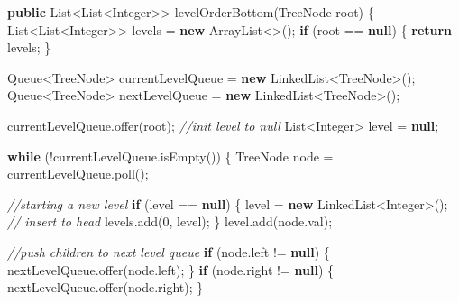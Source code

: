 \documentclass[]{book}
\newenvironment{Shaded}{\begin{snugshade}}{\end{snugshade}}
\newcommand{\BuiltInTok}[1]{#1}
\newcommand{\CommentTok}[1]{\textcolor[rgb]{0.56,0.35,0.01}{\textit{#1}}}
\newcommand{\DecValTok}[1]{\textcolor[rgb]{0.00,0.00,0.81}{#1}}
\newcommand{\FunctionTok}[1]{\textcolor[rgb]{0.00,0.00,0.00}{#1}}
\newcommand{\KeywordTok}[1]{\textcolor[rgb]{0.13,0.29,0.53}{\textbf{#1}}}
\newcommand{\NormalTok}[1]{#1}
\begin{document}
\begin{Shaded}
\begin{Highlighting}[]
\KeywordTok{public} \BuiltInTok{List}\NormalTok{<}\BuiltInTok{List}\NormalTok{<}\BuiltInTok{Integer}\NormalTok{>> }\FunctionTok{levelOrderBottom}\NormalTok{(}\BuiltInTok{TreeNode}\NormalTok{ root) \{}
    \BuiltInTok{List}\NormalTok{<}\BuiltInTok{List}\NormalTok{<}\BuiltInTok{Integer}\NormalTok{>> levels = }\KeywordTok{new} \BuiltInTok{ArrayList}\NormalTok{<>();}
    \KeywordTok{if}\NormalTok{ (root == }\KeywordTok{null}\NormalTok{) \{}
        \KeywordTok{return}\NormalTok{ levels;}
\NormalTok{    \}}

    \BuiltInTok{Queue}\NormalTok{<}\BuiltInTok{TreeNode}\NormalTok{> currentLevelQueue = }\KeywordTok{new} \BuiltInTok{LinkedList}\NormalTok{<}\BuiltInTok{TreeNode}\NormalTok{>();}
    \BuiltInTok{Queue}\NormalTok{<}\BuiltInTok{TreeNode}\NormalTok{> nextLevelQueue = }\KeywordTok{new} \BuiltInTok{LinkedList}\NormalTok{<}\BuiltInTok{TreeNode}\NormalTok{>();}

\NormalTok{    currentLevelQueue.}\FunctionTok{offer}\NormalTok{(root);}
    \CommentTok{//init level to null}
    \BuiltInTok{List}\NormalTok{<}\BuiltInTok{Integer}\NormalTok{> level = }\KeywordTok{null}\NormalTok{;}

    \KeywordTok{while}\NormalTok{ (!currentLevelQueue.}\FunctionTok{isEmpty}\NormalTok{()) \{}
        \BuiltInTok{TreeNode}\NormalTok{ node = currentLevelQueue.}\FunctionTok{poll}\NormalTok{();}

        \CommentTok{//starting a new level}
        \KeywordTok{if}\NormalTok{ (level == }\KeywordTok{null}\NormalTok{) \{}
\NormalTok{            level = }\KeywordTok{new} \BuiltInTok{LinkedList}\NormalTok{<}\BuiltInTok{Integer}\NormalTok{>();}
            \CommentTok{// insert to head}
\NormalTok{            levels.}\FunctionTok{add}\NormalTok{(}\DecValTok{0}\NormalTok{, level);}
\NormalTok{        \}}
\NormalTok{        level.}\FunctionTok{add}\NormalTok{(node.}\FunctionTok{val}\NormalTok{);}

        \CommentTok{//push children to next level queue}
        \KeywordTok{if}\NormalTok{ (node.}\FunctionTok{left}\NormalTok{ != }\KeywordTok{null}\NormalTok{) \{}
\NormalTok{            nextLevelQueue.}\FunctionTok{offer}\NormalTok{(node.}\FunctionTok{left}\NormalTok{);}
\NormalTok{        \}}
        \KeywordTok{if}\NormalTok{ (node.}\FunctionTok{right}\NormalTok{ != }\KeywordTok{null}\NormalTok{) \{}
\NormalTok{            nextLevelQueue.}\FunctionTok{offer}\NormalTok{(node.}\FunctionTok{right}\NormalTok{);}
\NormalTok{        \}}


\end{Highlighting}
\end{Shaded}
\end{document}

